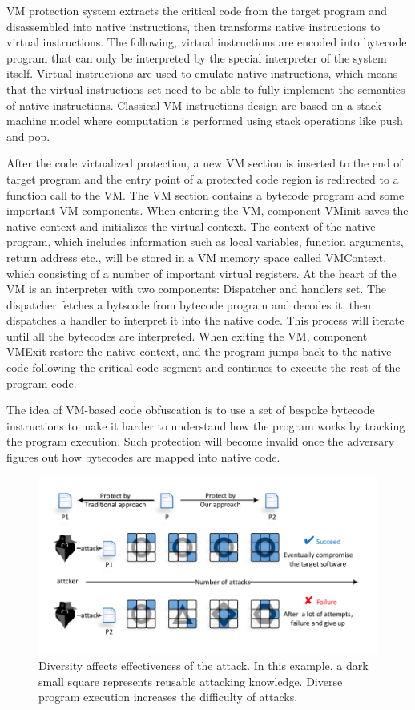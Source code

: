 \documentclass[times]{secauth}
\begin{document}
VM protection system extracts the critical code from the target program and disassembled
into native instructions, then transforms native instructions to virtual instructions.
The following, virtual instructions are encoded into bytecode program that can only be interpreted by
the special interpreter of the system itself. Virtual instructions are used to emulate native instructions,
which means that the virtual instructions set need to be able to fully implement the semantics of native instructions.
Classical VM instructions design are based on a stack machine model
where computation is performed using stack operations like push and pop.


After the code virtualized protection, a new VM section is inserted to the end of target program and the
entry point of a protected code region is redirected to a function call to the VM.
The VM section contains a bytecode program and some important VM components.
When entering the VM, component VMinit saves the native context and initializes the virtual context.
The context of the native program, which includes information such as local variables, function arguments, return address etc.,
will be stored in a VM memory space called VMContext, which consisting of a number of important virtual registers.
At the heart of the VM is an interpreter with two components: Dispatcher and handlers set.
The dispatcher fetches a bytscode from bytecode program and decodes it, then dispatches a handler to interpret it into the native code.
This process will iterate until all the bytecodes are interpreted. When exiting the VM, component VMExit restore the native context,
and the program jumps back to the native code following the critical code segment and continues to execute the rest of the program code.

The idea of VM-based code obfuscation is to use a set of bespoke bytecode instructions to
make it harder to understand how the program works by tracking the program execution.
Such protection will become invalid once the adversary figures out how bytecodes are mapped into native code.

\begin{figure}[t]%
    \centering
    \includegraphics[width=1\columnwidth]{figure/figone.pdf}
    \caption{Diversity affects effectiveness of the attack. In this example, a dark small square represents reusable attacking knowledge. Diverse program execution increases the difficulty of attacks.}\label{fig:Fig.1}
\end{figure}
\end{document}
